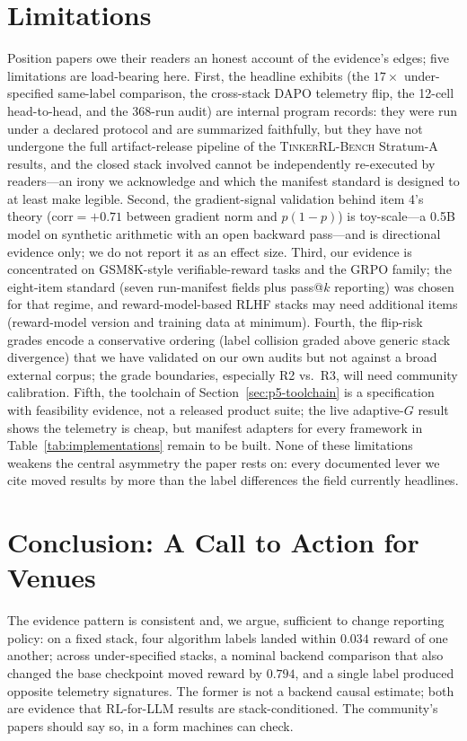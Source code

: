 \documentclass{article}  \usepackage[preprint,nonatbib]{neurips_2026} \usepackage[numbers]{natbib}
\newcommand{\ours}{\textsc{TinkerRL-Bench}}
\providecommand{\tableref}[1]{Table~\ref{#1}}
\providecommand{\secref}[1]{Section~\ref{#1}}
\begin{document}
 \section{Limitations}
\label{sec:p5-limitations}
Position papers owe their readers an honest account of the evidence's edges;
five limitations are load-bearing here. First, the headline exhibits
(the $17\times$ under-specified same-label comparison, the cross-stack DAPO telemetry flip, the
12-cell head-to-head, and the 368-run audit) are internal program records:
they were run under a declared protocol and are summarized faithfully, but
they have not undergone the full artifact-release pipeline of the \ours{}
Stratum-A results, and the closed stack involved cannot be independently
re-executed by readers---an irony we acknowledge and which the manifest
standard is designed to at least make legible. Second, the gradient-signal
validation behind item 4's theory ($\mathrm{corr} = +0.71$ between gradient
norm and $p(1-p)$) is toy-scale---a 0.5B model on synthetic arithmetic with
an open backward pass---and is directional evidence only; we do not report it
as an effect size. Third, our evidence is concentrated on GSM8K-style
verifiable-reward tasks and the GRPO family; the eight-item standard (seven
run-manifest fields plus pass@$k$ reporting) was chosen for that regime, and
reward-model-based RLHF stacks may need additional items
(reward-model version and training data at minimum). Fourth, the flip-risk
grades encode a conservative ordering (label collision graded above generic
stack divergence) that we have validated on our own audits but not against a
broad external corpus; the grade boundaries, especially R2 vs.\ R3, will need
community calibration. Fifth, the toolchain of \secref{sec:p5-toolchain} is a
specification with feasibility evidence, not a released product suite; the
live adaptive-$G$ result shows the telemetry is cheap, but manifest adapters
for every framework in \tableref{tab:implementations} remain to be built.
None of these limitations weakens the central asymmetry the paper rests on:
every documented lever we cite moved results by more than the label
differences the field currently headlines.
 \section{Conclusion: A Call to Action for Venues}
\label{sec:p5-conclusion}
The evidence pattern is consistent and, we argue, sufficient to change reporting
policy: on a fixed stack, four algorithm labels landed within $0.034$ reward
of one another; across under-specified stacks, a nominal backend comparison
that also changed the base checkpoint moved reward by $0.794$, and a single
label produced opposite telemetry signatures. The former is not a backend
causal estimate; both are evidence that RL-for-LLM results
are stack-conditioned. The community's papers should say so, in a form
machines can check.
\end{document}
